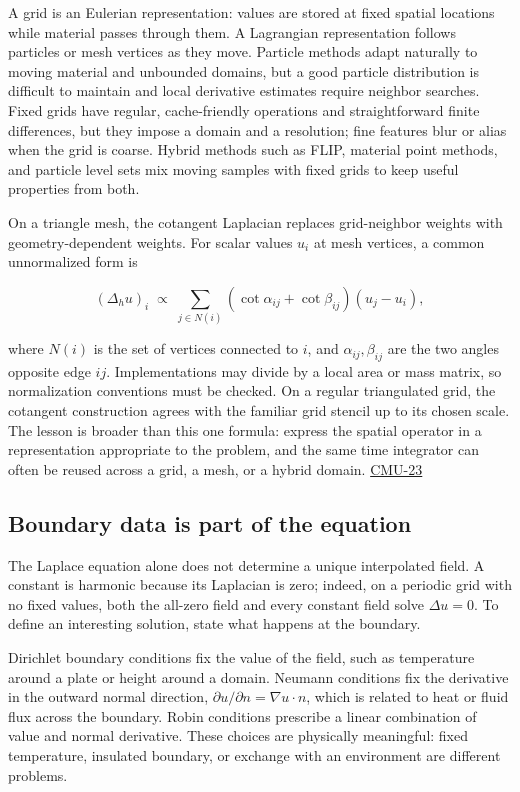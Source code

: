 A grid is an Eulerian representation: values are stored at fixed spatial locations while material passes through them. A Lagrangian representation follows particles or mesh vertices as they move. Particle methods adapt naturally to moving material and unbounded domains, but a good particle distribution is difficult to maintain and local derivative estimates require neighbor searches. Fixed grids have regular, cache-friendly operations and straightforward finite differences, but they impose a domain and a resolution; fine features blur or alias when the grid is coarse. Hybrid methods such as FLIP, material point methods, and particle level sets mix moving samples with fixed grids to keep useful properties from both.

On a triangle mesh, the cotangent Laplacian replaces grid-neighbor weights with geometry-dependent weights. For scalar values \(u_i\) at mesh vertices, a common unnormalized form is

\[
(\Delta_h u)_i\;\propto\;\sum_{j\in N(i)}(\cot\alpha_{ij}+\cot\beta_{ij})(u_j-u_i),
\]

where \(N(i)\) is the set of vertices connected to \(i\), and \(\alpha_{ij},\beta_{ij}\) are the two angles opposite edge \(ij\). Implementations may divide by a local area or mass matrix, so normalization conventions must be checked. On a regular triangulated grid, the cotangent construction agrees with the familiar grid stencil up to its chosen scale. The lesson is broader than this one formula: express the spatial operator in a representation appropriate to the problem, and the same time integrator can often be reused across a grid, a mesh, or a hybrid domain. \hyperref[04-visual-computing-ii-ch036-cmu-23---physically-based-animation-and-pdes]{CMU-23}

\subsection{Boundary data is part of the equation}\label{04-visual-computing-ii-ch030-boundary-data-is-part-of-the-equation}

The Laplace equation alone does not determine a unique interpolated field. A constant is harmonic because its Laplacian is zero; indeed, on a periodic grid with no fixed values, both the all-zero field and every constant field solve \(\Delta u=0\). To define an interesting solution, state what happens at the boundary.

Dirichlet boundary conditions fix the value of the field, such as temperature around a plate or height around a domain. Neumann conditions fix the derivative in the outward normal direction, \(\partial u/\partial n=\nabla u\cdot n\), which is related to heat or fluid flux across the boundary. Robin conditions prescribe a linear combination of value and normal derivative. These choices are physically meaningful: fixed temperature, insulated boundary, or exchange with an environment are different problems.

